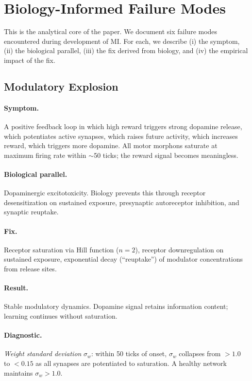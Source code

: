 \section{Biology-Informed Failure Modes}
\label{sec:failure_modes}

This is the analytical core of the paper. We document six failure modes encountered during development of MI. For each, we describe (i) the symptom, (ii) the biological parallel, (iii) the fix derived from biology, and (iv) the empirical impact of the fix.

\subsection{Modulatory Explosion}

\paragraph{Symptom.}
A positive feedback loop in which high reward triggers strong dopamine release, which potentiates active synapses, which raises future activity, which increases reward, which triggers more dopamine. All motor morphons saturate at maximum firing rate within $\sim$50 ticks; the reward signal becomes meaningless.

\paragraph{Biological parallel.}
Dopaminergic excitotoxicity. Biology prevents this through receptor desensitization on sustained exposure, presynaptic autoreceptor inhibition, and synaptic reuptake.

\paragraph{Fix.}
Receptor saturation via Hill function ($n=2$), receptor downregulation on sustained exposure, exponential decay (``reuptake'') of modulator concentrations from release sites.

\paragraph{Result.}
Stable modulatory dynamics. Dopamine signal retains information content; learning continues without saturation.

\paragraph{Diagnostic.}
\emph{Weight standard deviation} $\sigma_w$: within 50 ticks of onset, $\sigma_w$ collapses from $>1.0$ to $<0.15$ as all synapses are potentiated to saturation. A healthy network maintains $\sigma_w > 1.0$.

